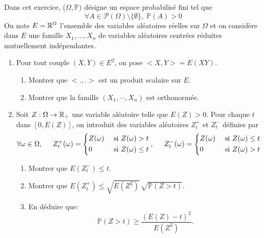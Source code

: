 Dans cet exercice, ($\Omega, \mathbb{P})$ désigne un espace probabilisé fini tel que
\begin{displaymath}
\forall A\in \mathcal{P}(\Omega)\setminus \{ \emptyset \}, \; \mathbb{P}(A)>0  
\end{displaymath}
On note $E = \mathbb{R}^{\Omega}$ l'ensemble des variables aléatoires réelles sur $\Omega$ et on considère dans $E$ une famille $X_{1},...,X_{n}$ de variables aléatoires centrées réduites mutuellement indépendantes. 

\begin{enumerate}
 \item Pour tout couple $(X,Y)\in E^{2}$, on pose $<X,Y> = E(XY)$.
\begin{enumerate}
  \item Montrer que $<.,.>$ est un produit  scalaire sur $E$.
  \item Montrer que la famille $(X_1,\cdots,X_n)$ est orthonormée.
\end{enumerate}

 \item Soit $Z:\Omega \to \mathbb{R}_{+}$ une variable aléatoire telle que $E(Z)>0$. Pour chaque $t$ dans $[0,E(Z)]$, on introduit des variables aléatoires $Z_t^+$ et $Z_t^-$ définies par
\begin{displaymath}
\forall \omega\in \Omega,\hspace{0.5cm}
Z_t^+(\omega) = 
\left\lbrace 
\begin{aligned}
  &Z(\omega) &\text{ si } Z(\omega)>t \\ &0 &\text{ si } Z(\omega)\leq t
\end{aligned}
\right.,\hspace{0.5cm}
Z_t^-(\omega) = 
\left\lbrace 
\begin{aligned}
  &Z(\omega) &\text{ si } Z(\omega)\leq t \\ &0 &\text{ si } Z(\omega)> t
\end{aligned}
\right.
\end{displaymath}

 \begin{enumerate}
  \item Montrer que $E(Z_t^-) \leq t$. 
  \item Montrer que $E(Z_t^+) \leq \sqrt{E(Z^{2})}\, \sqrt{\mathbb{P}(Z>t)}$.
  \item En déduire que:
  $$\mathbb{P}(Z>t) \geq \frac{(E(Z)-t)^{2}}{E(Z^{2})}.$$
 \end{enumerate}
 

\end{enumerate}

